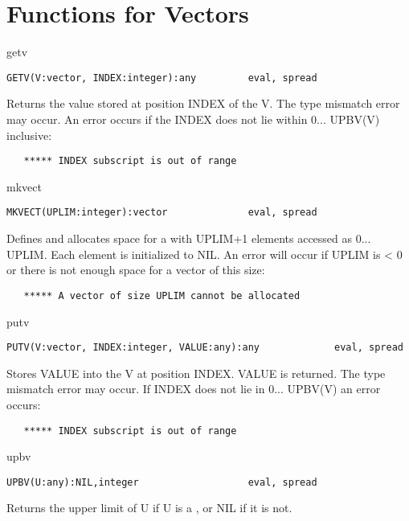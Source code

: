 \section{Functions for Vectors}


\begin{Function}{getv}
\begin{verbatim}
GETV(V:vector, INDEX:integer):any         eval, spread
\end{verbatim}
   Returns  the value stored  at position INDEX  of the  V.
   The  type mismatch error  may occur.   An error  occurs if the
   INDEX does not lie within 0... UPBV(V) inclusive:
\begin{verbatim}
   ***** INDEX subscript is out of range
\end{verbatim}
\end{Function}
\begin{Function}{mkvect}
\begin{verbatim}
MKVECT(UPLIM:integer):vector              eval, spread
\end{verbatim}
   Defines   and  allocates  space  for  a    with  UPLIM+1
   elements  accessed as 0... UPLIM. Each  element is initialized
   to  NIL. An error will occur  if UPLIM is <  0 or there is not
   enough space for a vector of this size:
\begin{verbatim}
   ***** A vector of size UPLIM cannot be allocated
\end{verbatim}
\end{Function}
\begin{Function}{putv}
\begin{verbatim}
PUTV(V:vector, INDEX:integer, VALUE:any):any             eval, spread
\end{verbatim}
   Stores  VALUE into  the  V  at position  INDEX. VALUE is
   returned.   The type mismatch error may  occur.  If INDEX does
   not lie in 0... UPBV(V) an error occurs:
\begin{verbatim}
   ***** INDEX subscript is out of range
\end{verbatim}
\end{Function}
\begin{Function}{upbv}
\begin{verbatim}
UPBV(U:any):NIL,integer                   eval, spread
\end{verbatim}
   Returns  the upper limit of U  if U is a  , or NIL if it
   is not.

\end{Function}


